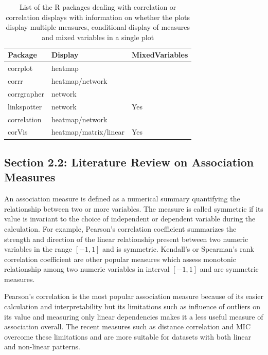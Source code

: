 \begin{Schunk}
\begin{table}

\caption{\label{tab:corrdisplay-packages}List of the R packages dealing with correlation or correlation displays with information on whether the plots display multiple measures, conditional display of measures and mixed variables in a single plot}
\centering
\begin{tabular}[t]{lll}
\toprule
Package & Display & MixedVariables\\
\midrule
corrplot & heatmap & \\
corrr & heatmap/network & \\
corrgrapher & network & \\
linkspotter & network & Yes\\
correlation & heatmap/network & \\
\addlinespace
corVis & heatmap/matrix/linear & Yes\\
\bottomrule
\end{tabular}
\end{table}

\end{Schunk}

\hypertarget{section-2.2-literature-review-on-association-measures}{%
\subsection{Section 2.2: Literature Review on Association
Measures}\label{section-2.2-literature-review-on-association-measures}}

An association measure is defined as a numerical summary quantifying the
relationship between two or more variables. The measure is called
symmetric if its value is invariant to the choice of independent or
dependent variable during the calculation. For example, Pearson's
correlation coefficient summarizes the strength and direction of the
linear relationship present between two numeric variables in the range
\([-1,1]\) and is symmetric. Kendall's or Spearman's rank correlation
coefficient are other popular measures which assess monotonic
relationship among two numeric variables in interval \([-1,1]\) and are
symmetric measures.

Pearson's correlation is the most popular association measure because of
its easier calculation and interpretability but its limitations such as
influence of outliers on its value and measuring only linear
dependencies makes it a less useful measure of association overall. The
recent measures such as distance correlation
\citep{szekely2007measuring} and MIC \citep{reshef2011detecting}
overcome these limitations and are more suitable for datasets with both
linear and non-linear patterns.

